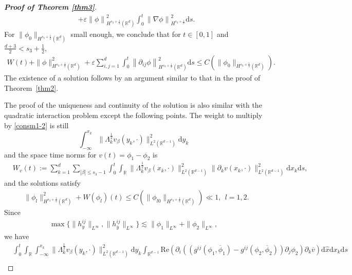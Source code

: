 \documentclass[10pt,twoside,a4paper]{article}
\numberwithin{equation}{section}\allowdisplaybreaks
\def\leq{\leqslant}
\begin{document}
\begin{proof}[\textbf{Proof of Theorem \ref{thm3}}]
\begin{align*}
		&+\varepsilon  \left\|  \phi\right\|_{H^{s_3+\frac 12}(\mathbb{R}^d)}^2 \int_0^t\left\| \nabla\phi\right\|_{H^{s_3+\frac 12}}^2 \mathrm{d} s.
	\end{align*}
	For $ \|\phi_0\|_{H^{s_3+\frac12}(\mathbb{R}^{d})} $ small enough, we conclude that for \(t \in [0,1]\) and \(\frac{d+3}{2} < s_3 + \frac12\),
	\begin{align*} 
		W(t) +\|\phi\|_{H^{s_3+\frac12}(\mathbb{R}^{d})}^2+\varepsilon  \sum_{i,j=1}^d\int_0^t\left\| \partial_{ij}\phi\right\|_{H^{s_3+\frac 12}(\mathbb{R}^d)}^2 \mathrm{d} s \leq C\left(\|\phi_0\|_{H^{s_3+\frac12}(\mathbb{R}^{d})}\right).
	\end{align*}
	The existence of a solution follows by an argument similar to that in the proof of Theorem~\ref{thm2}.
	 
	 The proof of the uniqueness and continuity of the solution  is also similar with the quadratic interaction problem except the following points.  The weight to multiply by \eqref{consm1-2} is still
 $$ \int_{-\infty}^{x_k} \|\Lambda_k^{\frac 12}v_{\beta}(y_k,\cdot)\|^2_{L^2(\mathbb{R}^{d-1})} \mathrm{d} y_k  $$ and the space time norms for $ v(t) =\phi_1 -\phi_2$ is
	 \begin{align*}
	 	&W_v(t)	
	 	:=\sum_{k=1}^d\sum_{|\beta|\leq s_3-1} \int_0^t \int_{\mathbb{R}}  \| \Lambda_k^{\frac 12}v_{\beta}(x_k,\cdot)\|_{L^2(\mathbb{R}^{d-1})}^2  \|\partial_k v (x_k,\cdot)\|_{L^2(\mathbb{R}^{d-1})}^2 \mathrm{d} x_k \mathrm{d} s,
	 \end{align*}
	 and  
	 the solutions satisfy
	 \begin{align*}
	 	\label{csol1-2}
	 	&	\|\phi_l\|_{H^{s_3+\frac12}(\mathbb{R}^{d})}^2+	W(\phi_l)(t) \leq C\left(\|\phi_{l0}\|_{H^{s_3+\frac12}(\mathbb{R}^{d})}\right)\ll 1,~~l=1,2.
	 \end{align*}
	 Since 
	 \begin{align*}
	 	\max\{ \|h^{ij}_y\|_{L^{\infty}}, \|h^{ij}_{\overline{y}}\|_{L^{\infty}}\} \lesssim  \| \phi_1\|_{L^{\infty}}+\| \phi_2\|_{L^{\infty}},
	 \end{align*}
we have
	 \begin{align}
	 	&\int_0^t \int_{\mathbb{R}}\int_{-\infty}^{x_k} \|\Lambda_k^{\frac 12}v_{\beta}(y_k,\cdot)\|^2_{L^2(\mathbb{R}^{d-1})} \mathrm{d} y_k	\int_{\mathbb{R}^{d-1}} \mathrm{Re} \left(\partial_i\left( (g^{ij}\left(\phi_1,\overline{\phi}_1\right)-g^{ij}\left(\phi_2,\overline{\phi}_2\right)) \partial_j\phi_2\right)\partial_k \overline{v} \right)   \mathrm{d} \hat{x}  \mathrm{d} x_k \mathrm{d}s\nonumber\\

\end{align}
\end{proof}
\end{document}
